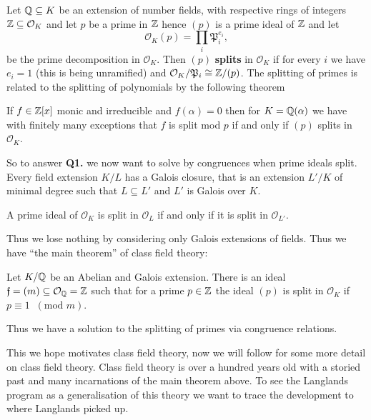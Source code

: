 Let \(\Q \subseteq K\) be an extension of number fields, with respective rings of integers \(\Z \subseteq \mathcal{O}_K\) and let \(p\) be a prime in \(\Z\) hence \((p)\) is a prime ideal of \(\Z\) and let 
\[\mathcal{O}_K(p) = \prod_i \mathfrak{P}_i^{e_i},\]
be the prime decomposition in \(\mathcal{O}_K\). Then \((p)\) \textbf{splits} in \(\mathcal{O}_K\) if for every \(i\) we  have \(e_i = 1\) (this is being unramified) and \(\mathcal{O}_K/\mathfrak{P}_i \cong \Z/(p)\). The splitting of primes is related to the splitting of polynomials by the following theorem
\begin{Theorem}
	If \(f\in \Z[x]\) monic and irreducible and \(f(\alpha) = 0\) then for \(K = \Q(\alpha)\) we have with finitely many exceptions that \(f\) is split mod \(p\) if and only if \((p)\) splits in \(\mathcal{O}_K\).
\end{Theorem}
So to answer \textbf{Q1.} we now want to solve by congruences when prime ideals split. Every field extension \(K/L\) has a Galois closure, that is an extension \(L'/K\) of minimal degree such that \(L\subseteq L'\) and \(L'\) is Galois over \(K\). 
\begin{Lemma}
	A prime ideal of \(\mathcal{O}_K\) is split in \(\mathcal{O}_L\) if and only if it is split in \(\mathcal{O}_{L'}\).
\end{Lemma}
Thus we lose nothing by considering only Galois extensions of fields. Thus we have ``the main theorem'' of class field theory:
\begin{Theorem}\label{thm:reciprocity}
	Let \(K/\Q\) be an Abelian and Galois extension. There is an ideal \(\mathfrak{f} = (m)\subseteq \mathcal{O}_\Q = \Z\) such that for a prime \(p\in \Z\) the ideal \((p)\) is split in \(\mathcal{O}_K\) if \(p\equiv 1 \;\; (\text{mod }m)\).
\end{Theorem} 
Thus we have a solution to the splitting of primes via congruence relations. 


This we hope motivates class field theory, now we will follow \cite{conradHISTORYCLASSFIELD} for some more detail on class field theory. Class field theory is over a hundred years old with a storied past and many incarnations of the main theorem above. To see the Langlands program as a generalisation of this theory we want to trace the development to where Langlands picked up. 

